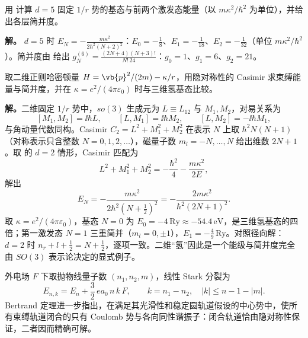 \begin{workedexample}
用 计算 \(d=5\) 固定 \(1/r\) 势的基态与前两个激发态能量（以 \(m\kappa^2/\hbar^2\) 为单位），并给出各层简并度。

\textbf{解。} \(d=5\) 时 \(E_N=-\frac{m\kappa^2}{2\hbar^2(N+2)^2}\)：\(E_0=-\frac18\)、\(E_1=-\frac1{18}\)、\(E_2=-\frac1{32}\)（单位 \(m\kappa^2/\hbar^2\)）。简并度由 给出 \(g_N^{(6)}=\frac{(2N+4)(N+3)!}{N!\,24}\)：\(g_0=1\)、\(g_1=6\)、\(g_2=21\)。
\end{workedexample}

\begin{exbox}[\(d=2\) 氢模型：\(SO(3)\) Casimir 的显式计算]
取二维正则哈密顿量 $H=\vb{p}^2/(2m)-\kappa/r$，用隐对称性的 Casimir 求束缚能量与简并度，并在 $\kappa=e^2/(4\pi\varepsilon_0)$ 时与三维氢基态比较。

\textbf{解。}二维固定 \(1/r\) 势中，\(so(3)\) 生成元为 \(L\equiv L_{12}\) 与 \(M_1,M_2\)，对易关系为
\[
[M_1,M_2]=\ii\hbar L,\qquad
[L,M_1]=\ii\hbar M_2,\qquad
[L,M_2]=-\ii\hbar M_1,
\]
与角动量代数同构。Casimir \(C_2=L^2+M_1^2+M_2^2\) 在表示 \(N\) 上取 \(\hbar^2N(N+1)\)（对称表示只含整数 \(N=0,1,2,\ldots\)），磁量子数 \(m_l=-N,\ldots,N\) 给出维数 \(2N+1\)。取 的 \(d=2\) 情形，Casimir 匹配为
\[
L^2+M_1^2+M_2^2=-\frac{\hbar^2}{4}-\frac{m\kappa^2}{2E},
\]
解出
\[
E_N=-\frac{m\kappa^2}{2\hbar^2\left(N+\frac12\right)^2}
=-\frac{2m\kappa^2}{\hbar^2(2N+1)^2}.
\]
取 \(\kappa=e^2/(4\pi\varepsilon_0)\)，基态 \(N=0\) 为 \(E_0=-4\,\mathrm{Ry}\approx-54.4\,\mathrm{eV}\)，是三维氢基态的四倍；第一激发态 \(N=1\) 三重简并（\(m_l=0,\pm1\)），\(E_1=-\frac49\,\mathrm{Ry}\)。对照径向解：\(d=2\) 时 \(n_r+l+\frac12=N+\frac12\)，逐项一致。二维“氢”因此是一个能级与简并度完全由 \(SO(3)\) 表示论决定的显式例子。
\end{exbox}

\begin{note}
外电场 \(F\) 下取抛物线量子数 \((n_1,n_2,m)\)，线性 Stark 分裂为
\[
 E_{n,k}=E_n+\frac32\,e a_0\,n\,k\,F,\qquad k=n_1-n_2,\quad |k|\le n-1-|m|.
\]
Bertrand 定理进一步指出，在满足其光滑性和稳定圆轨道假设的中心势中，使所有束缚轨道闭合的只有 Coulomb 势与各向同性谐振子：闭合轨道恰由隐对称性保证，二者因而精确可解。
\end{note}




